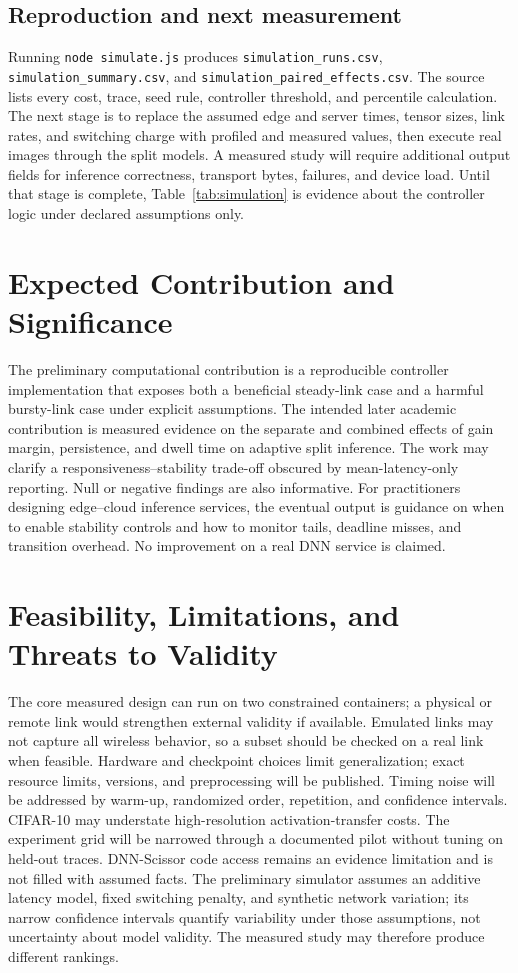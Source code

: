\documentclass[10pt,a4paper,twocolumn]{article}
\begin{document}
\subsection{Reproduction and next measurement}
Running \texttt{node simulate.js} produces \texttt{simulation\_runs.csv}, \texttt{simulation\_summary.csv}, and \texttt{simulation\_paired\_effects.csv}. The source lists every cost, trace, seed rule, controller threshold, and percentile calculation. The next stage is to replace the assumed edge and server times, tensor sizes, link rates, and switching charge with profiled and measured values, then execute real images through the split models. A measured study will require additional output fields for inference correctness, transport bytes, failures, and device load. Until that stage is complete, Table~\ref{tab:simulation} is evidence about the controller logic under declared assumptions only.

\section{Expected Contribution and Significance}
The preliminary computational contribution is a reproducible controller implementation that exposes both a beneficial steady-link case and a harmful bursty-link case under explicit assumptions. The intended later academic contribution is measured evidence on the separate and combined effects of gain margin, persistence, and dwell time on adaptive split inference. The work may clarify a responsiveness--stability trade-off obscured by mean-latency-only reporting. Null or negative findings are also informative. For practitioners designing edge--cloud inference services, the eventual output is guidance on when to enable stability controls and how to monitor tails, deadline misses, and transition overhead. No improvement on a real DNN service is claimed.

\section{Feasibility, Limitations, and Threats to Validity}
The core measured design can run on two constrained containers; a physical or remote link would strengthen external validity if available. Emulated links may not capture all wireless behavior, so a subset should be checked on a real link when feasible. Hardware and checkpoint choices limit generalization; exact resource limits, versions, and preprocessing will be published. Timing noise will be addressed by warm-up, randomized order, repetition, and confidence intervals. CIFAR-10 may understate high-resolution activation-transfer costs. The experiment grid will be narrowed through a documented pilot without tuning on held-out traces. DNN-Scissor code access remains an evidence limitation and is not filled with assumed facts. The preliminary simulator assumes an additive latency model, fixed switching penalty, and synthetic network variation; its narrow confidence intervals quantify variability under those assumptions, not uncertainty about model validity. The measured study may therefore produce different rankings.
\end{document}
